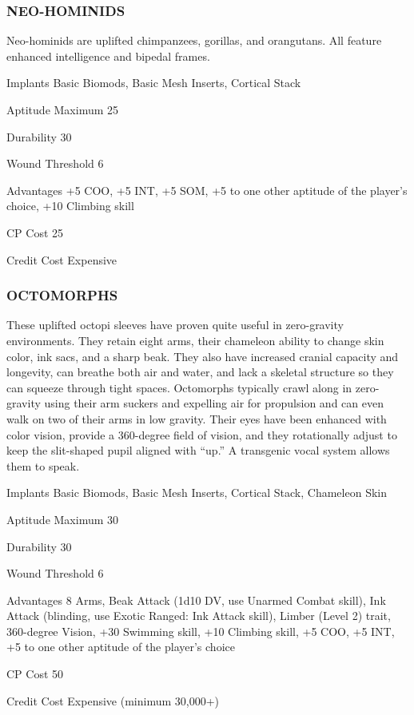 \subsubsection{NEO-HOMINIDS}
Neo-hominids are uplifted chimpanzees, gorillas, and orangutans. All feature
enhanced intelligence and bipedal frames.

\begin{description*}
\item[Implants] Basic Biomods, Basic Mesh Inserts, Cortical Stack 
\item[Aptitude Maximum] 25 
\item[Durability] 30 
\item[Wound Threshold] 6 
\item[Advantages] +5 COO, +5 INT, +5 SOM, +5 to one other aptitude of the
  player’s choice, +10 Climbing skill
\item[CP Cost] 25 
\item[Credit Cost] Expensive 
\end{description*}

\subsubsection{OCTOMORPHS}
These uplifted octopi sleeves have proven quite useful in zero-gravity
environments. They retain eight arms, their chameleon ability to change skin
color, ink sacs, and a sharp beak. They also have increased cranial capacity
and longevity, can breathe both air and water, and lack a skeletal structure so
they can squeeze through tight spaces. Octomorphs typically crawl along in
zero-gravity using their arm suckers and expelling air for propulsion and can
even walk on two of their arms in low gravity. Their eyes have been enhanced
with color vision, provide a 360-degree field of vision, and they rotationally
adjust to keep the slit-shaped pupil aligned with “up.” A transgenic vocal
system allows them to speak.

\begin{description*}
\item[Implants] Basic Biomods, Basic Mesh Inserts, Cortical Stack, Chameleon
  Skin
\item[Aptitude Maximum] 30 
\item[Durability] 30 
\item[Wound Threshold] 6 
\item[Advantages] 8 Arms, Beak Attack (1d10 DV, use Unarmed Combat skill), Ink
  Attack (blinding, use Exotic Ranged: Ink Attack skill), Limber (Level 2)
  trait, 360-degree Vision, +30 Swimming skill, +10 Climbing skill, +5 COO, +5
  INT, +5 to one other aptitude of the player’s choice
\item[CP Cost] 50 
\item[Credit Cost] Expensive (minimum 30,000+) 
\end{description*}

